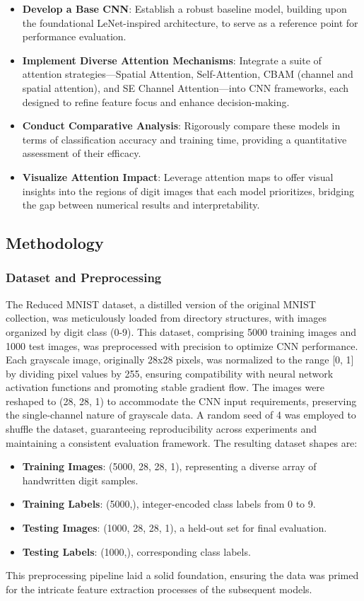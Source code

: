 \documentclass[12pt]{article}
\begin{document}
\begin{itemize}
    \item \textbf{Develop a Base CNN}: Establish a robust baseline model, building upon the foundational LeNet-inspired architecture, to serve as a reference point for performance evaluation.
    \item \textbf{Implement Diverse Attention Mechanisms}: Integrate a suite of attention strategies—Spatial Attention, Self-Attention, CBAM (channel and spatial attention), and SE Channel Attention—into CNN frameworks, each designed to refine feature focus and enhance decision-making.
    \item \textbf{Conduct Comparative Analysis}: Rigorously compare these models in terms of classification accuracy and training time, providing a quantitative assessment of their efficacy.
    \item \textbf{Visualize Attention Impact}: Leverage attention maps to offer visual insights into the regions of digit images that each model prioritizes, bridging the gap between numerical results and interpretability.\\
\end{itemize}

\newpage
\subsection{Methodology}

\subsubsection{Dataset and Preprocessing}
The Reduced MNIST dataset, a distilled version of the original MNIST collection, was meticulously loaded from directory structures, with images organized by digit class (0-9). This dataset, comprising 5000 training images and 1000 test images, was preprocessed with precision to optimize CNN performance. Each grayscale image, originally 28x28 pixels, was normalized to the range [0, 1] by dividing pixel values by 255, ensuring compatibility with neural network activation functions and promoting stable gradient flow. The images were reshaped to (28, 28, 1) to accommodate the CNN input requirements, preserving the single-channel nature of grayscale data. A random seed of 4 was employed to shuffle the dataset, guaranteeing reproducibility across experiments and maintaining a consistent evaluation framework. The resulting dataset shapes are:
\begin{itemize}
    \item \textbf{Training Images}: (5000, 28, 28, 1), representing a diverse array of handwritten digit samples.
    \item \textbf{Training Labels}: (5000,), integer-encoded class labels from 0 to 9.
    \item \textbf{Testing Images}: (1000, 28, 28, 1), a held-out set for final evaluation.
    \item \textbf{Testing Labels}: (1000,), corresponding class labels.
\end{itemize}
This preprocessing pipeline laid a solid foundation, ensuring the data was primed for the intricate feature extraction processes of the subsequent models.
\end{document}
